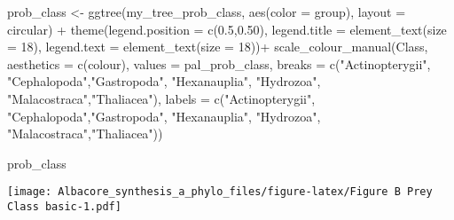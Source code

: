 \documentclass[
]{article}
\newenvironment{Shaded}{\begin{snugshade}}{\end{snugshade}}
\newcommand{\AttributeTok}[1]{\textcolor[rgb]{0.77,0.63,0.00}{#1}}
\newcommand{\DecValTok}[1]{\textcolor[rgb]{0.00,0.00,0.81}{#1}}
\newcommand{\FloatTok}[1]{\textcolor[rgb]{0.00,0.00,0.81}{#1}}
\newcommand{\FunctionTok}[1]{\textcolor[rgb]{0.00,0.00,0.00}{#1}}
\newcommand{\NormalTok}[1]{#1}
\newcommand{\OtherTok}[1]{\textcolor[rgb]{0.56,0.35,0.01}{#1}}
\newcommand{\SpecialCharTok}[1]{\textcolor[rgb]{0.00,0.00,0.00}{#1}}
\newcommand{\StringTok}[1]{\textcolor[rgb]{0.31,0.60,0.02}{#1}}
\begin{document}
\begin{Shaded}
\begin{Highlighting}[]
\NormalTok{prob\_class }\OtherTok{\textless{}{-}} \FunctionTok{ggtree}\NormalTok{(my\_tree\_prob\_class, }\FunctionTok{aes}\NormalTok{(}\AttributeTok{color =}\NormalTok{ group), }\AttributeTok{layout =} \StringTok{\textquotesingle{}circular\textquotesingle{}}\NormalTok{) }\SpecialCharTok{+}
   \FunctionTok{theme}\NormalTok{(}\AttributeTok{legend.position =} \FunctionTok{c}\NormalTok{(}\FloatTok{0.5}\NormalTok{,}\FloatTok{0.50}\NormalTok{),}
        \AttributeTok{legend.title =} \FunctionTok{element\_text}\NormalTok{(}\AttributeTok{size =} \DecValTok{18}\NormalTok{), }
        \AttributeTok{legend.text =} \FunctionTok{element\_text}\NormalTok{(}\AttributeTok{size =} \DecValTok{18}\NormalTok{))}\SpecialCharTok{+}
  \FunctionTok{scale\_colour\_manual}\NormalTok{(}\StringTok{\textquotesingle{}Class\textquotesingle{}}\NormalTok{, }\AttributeTok{aesthetics =} \FunctionTok{c}\NormalTok{(}\StringTok{\textquotesingle{}colour\textquotesingle{}}\NormalTok{), }\AttributeTok{values =}\NormalTok{ pal\_prob\_class,}
                      \AttributeTok{breaks =} \FunctionTok{c}\NormalTok{(}\StringTok{"Actinopterygii"}\NormalTok{, }\StringTok{"Cephalopoda"}\NormalTok{,}\StringTok{"Gastropoda"}\NormalTok{, }\StringTok{"Hexanauplia"}\NormalTok{, }\StringTok{"Hydrozoa"}\NormalTok{, }\StringTok{"Malacostraca"}\NormalTok{,}\StringTok{"Thaliacea"}\NormalTok{),}
                      \AttributeTok{labels =} \FunctionTok{c}\NormalTok{(}\StringTok{"Actinopterygii"}\NormalTok{, }\StringTok{"Cephalopoda"}\NormalTok{,}\StringTok{"Gastropoda"}\NormalTok{, }\StringTok{"Hexanauplia"}\NormalTok{, }\StringTok{"Hydrozoa"}\NormalTok{, }\StringTok{"Malacostraca"}\NormalTok{,}\StringTok{"Thaliacea"}\NormalTok{))}

\NormalTok{prob\_class}
\end{Highlighting}
\end{Shaded}

\texttt{[image: Albacore\_synthesis\_a\_phylo\_files/figure-latex/Figure B Prey Class basic-1.pdf]}
\end{document}
